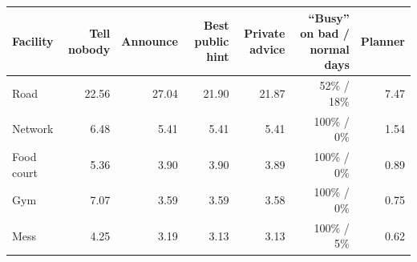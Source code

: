 \begin{tabular}{@{}lrrrrrr@{}}\toprule
Facility & Tell nobody & Announce & Best public hint & Private advice & ``Busy'' on bad / normal days & Planner\\\midrule
Road & 22.56 & \textcolor{cNE}{27.04} & 21.90 & 21.87 & 52\% / 18\% & 7.47\\
Network & 6.48 & 5.41 & 5.41 & 5.41 & 100\% / 0\% & 1.54\\
Food court & 5.36 & 3.90 & 3.90 & 3.89 & 100\% / 0\% & 0.89\\
Gym & 7.07 & 3.59 & 3.59 & 3.58 & 100\% / 0\% & 0.75\\
Mess & 4.25 & 3.19 & 3.13 & 3.13 & 100\% / 5\% & 0.62\\
\bottomrule
\end{tabular}
